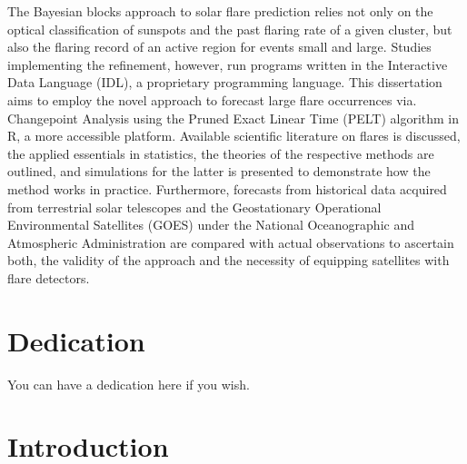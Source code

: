 \documentclass[12pt,twoside]{reedthesis}
\begin{document}
	The Bayesian blocks approach to solar flare prediction relies not only on the optical classification of sunspots and the past flaring rate of a given cluster, but also the flaring record of an active region for events small and large. Studies implementing the refinement, however, run programs written in the Interactive Data Language (IDL), a proprietary programming language. This dissertation aims to employ the novel approach to forecast large flare occurrences via. Changepoint Analysis using the Pruned Exact Linear Time (PELT) algorithm in R, a more accessible platform. Available scientific literature on flares is discussed, the applied essentials in statistics, the theories of the respective methods are outlined, and simulations for the latter is presented to demonstrate how the method works in practice. Furthermore, forecasts from historical data acquired from terrestrial solar telescopes and the Geostationary Operational Environmental Satellites (GOES) under the National Oceanographic and Atmospheric Administration are compared with actual observations to ascertain both, the validity of the approach and the necessity of equipping satellites with flare detectors.             
	
	
	\chapter*{Dedication}
	You can have a dedication here if you wish.

  \mainmatter %
  \pagestyle{fancyplain} %




    \chapter*{Introduction}

	
\end{document}
